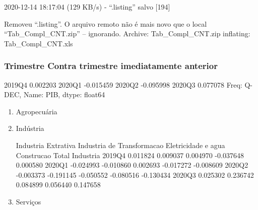 \documentclass[11pt]{article}
\begin{document}
2020-12-14 18:17:04 (129 KB/s) - “.listing” salvo [194]

Removeu “.listing”.
O arquivo remoto não é mais novo que o local “Tab\_Compl\_CNT.zip” -- ignorando.
Archive:  Tab\_Compl\_CNT.zip
  inflating: Tab\_Compl\_CNT.xls

\subsubsection{Trimestre Contra trimestre imediatamente anterior}
\label{sec:org25f3804}

2019Q4    0.002203
2020Q1   -0.015459
2020Q2   -0.095998
2020Q3    0.077078
Freq: Q-DEC, Name: PIB, dtype: float64

\begin{enumerate}
\item Agropecuária
\label{sec:org82dff0a}

\item Indústria
\label{sec:orgec3ebb2}

        Industria Extrativa  Industria de Transformacao  Eletricidade e agua  Construcao  Total Industria
2019Q4             0.011824                    0.009037             0.004970   -0.037648         0.000580
2020Q1            -0.024993                   -0.010860             0.002693   -0.017272        -0.008609
2020Q2            -0.003373                   -0.191145            -0.050552   -0.080516        -0.130434
2020Q3             0.025302                    0.236742             0.084899    0.056440         0.147658


\item Serviços
\label{sec:org7df41ba}


\end{enumerate}
\end{document}

